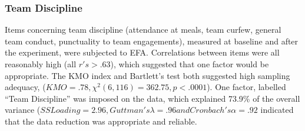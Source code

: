 \begin{CJK}{UTF8}{gbsn}
%  


%  


\subsubsection{Team Discipline\label{app9:teamDisciplineEFA}}
Items concerning team discipline (attendance at meals, team curfew, general team conduct, punctuality to team engagements), measured at baseline and after the experiment, were subjected to EFA.  Correlations between items were all reasonably high (all $r's > .63$), which suggested that one factor would be appropriate.
The KMO index and Bartlett's test both suggested high sampling adequacy, ($KMO = .78, \chi^2(6, 116) = 362.75, p < .0001$).  One factor, labelled ``Team Discipline'' was imposed on the data, which explained 73.9\% of the overall variance
($ SS Loading = 2.96, Guttman's \lambda = .96 and Cronbach's \alpha = .92$ indicated that the data reduction was appropriate and reliable.





\end{CJK}

